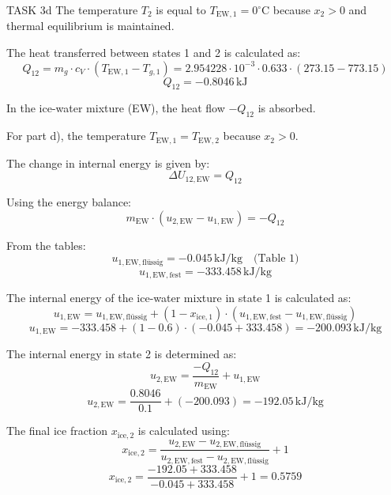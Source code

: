 TASK 3d  
The temperature \( T_2 \) is equal to \( T_{\text{EW},1} = 0^\circ \text{C} \) because \( x_2 > 0 \) and thermal equilibrium is maintained.

The heat transferred between states 1 and 2 is calculated as:  
\[
Q_{12} = m_g \cdot c_V \cdot (T_{\text{EW},1} - T_{g,1}) = 2.954228 \cdot 10^{-3} \cdot 0.633 \cdot (273.15 - 773.15)
\]  
\[
Q_{12} = -0.8046 \, \text{kJ}
\]

In the ice-water mixture (EW), the heat flow \( -Q_{12} \) is absorbed.

For part d), the temperature \( T_{\text{EW},1} = T_{\text{EW},2} \) because \( x_2 > 0 \).

The change in internal energy is given by:  
\[
\Delta U_{12,\text{EW}} = Q_{12}
\]

Using the energy balance:  
\[
m_{\text{EW}} \cdot (u_{2,\text{EW}} - u_{1,\text{EW}}) = -Q_{12}
\]

From the tables:  
\[
u_{1,\text{EW},\text{flüssig}} = -0.045 \, \text{kJ/kg} \quad \text{(Table 1)}
\]  
\[
u_{1,\text{EW},\text{fest}} = -333.458 \, \text{kJ/kg}
\]

The internal energy of the ice-water mixture in state 1 is calculated as:  
\[
u_{1,\text{EW}} = u_{1,\text{EW},\text{flüssig}} + (1 - x_{\text{ice},1}) \cdot (u_{1,\text{EW},\text{fest}} - u_{1,\text{EW},\text{flüssig}})
\]  
\[
u_{1,\text{EW}} = -333.458 + (1 - 0.6) \cdot (-0.045 + 333.458) = -200.093 \, \text{kJ/kg}
\]

The internal energy in state 2 is determined as:  
\[
u_{2,\text{EW}} = \frac{-Q_{12}}{m_{\text{EW}}} + u_{1,\text{EW}}
\]  
\[
u_{2,\text{EW}} = \frac{0.8046}{0.1} + (-200.093) = -192.05 \, \text{kJ/kg}
\]

The final ice fraction \( x_{\text{ice},2} \) is calculated using:  
\[
x_{\text{ice},2} = \frac{u_{2,\text{EW}} - u_{2,\text{EW},\text{flüssig}}}{u_{2,\text{EW},\text{fest}} - u_{2,\text{EW},\text{flüssig}}} + 1
\]  
\[
x_{\text{ice},2} = \frac{-192.05 + 333.458}{-0.045 + 333.458} + 1 = 0.5759
\]